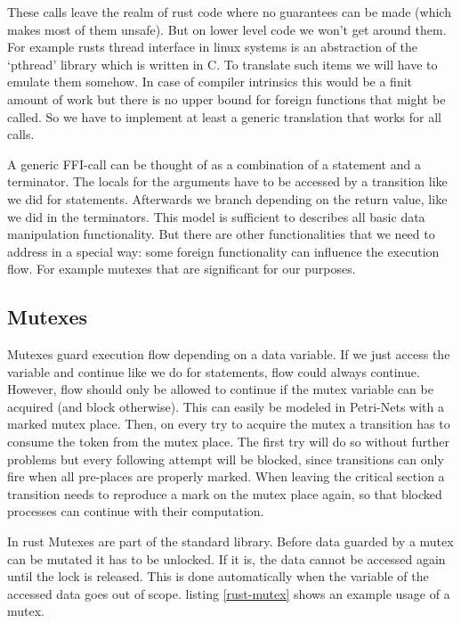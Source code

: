 These calls leave the realm of rust code where no guarantees can be made (which makes most of them unsafe).
But on lower level code we won't get around them.
For example rusts thread interface in linux systems is an abstraction of the `pthread' library which is written in C.
To translate such items we will have to emulate them somehow.
In case of compiler intrinsics this would be a finit amount of work but there is no upper bound for foreign functions that might be called.
So we have to implement at least a generic translation that works for all calls.

A generic FFI-call can be thought of as a combination of a statement and a terminator.
The locals for the arguments have to be accessed by a transition like we did for statements.
Afterwards we branch depending on the return value, like we did in the terminators.
This model is sufficient to describes all basic data manipulation functionality.
But there are other functionalities that we need to address in a special way:
some foreign functionality can influence the execution flow.
For example mutexes that are significant for our purposes.

\subsection*{Mutexes}
Mutexes guard execution flow depending on a data variable.
If we just access the variable and continue like we do for statements, flow could always continue.
However, flow should only be allowed to continue if the mutex variable can be acquired (and block otherwise).
This can easily be modeled in Petri-Nets with a marked mutex place.
Then, on every try to acquire the mutex a transition has to consume the token from the mutex place.
The first try will do so without further problems but every following attempt will be blocked, since transitions can only fire when all pre-places are properly marked.
When leaving the critical section a transition needs to reproduce a mark on the mutex place again, so that blocked processes can continue with their computation.

In rust Mutexes are part of the standard library.
Before data guarded by a mutex can be mutated it has to be unlocked.
If it is, the data cannot be accessed again until the lock is released.
This is done automatically when the variable of the accessed data goes out of scope.
listing \ref{rust-mutex} shows an example usage of a mutex.

